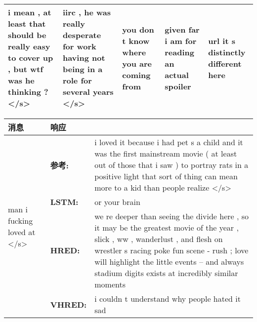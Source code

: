 \begin{table}
\begin{tabular}{
    m{}
    m{}
    m{}
    m{}
    m{}
    }
        \hline
        i mean , at least that should be really easy to cover up , but wtf was he thinking ? </s> & iirc , he was really desperate for work having not being in a role for several years </s> & you don t know where you are coming from & given far i am for reading an actual spoiler & url it s distinctly different here \\
        \hline
    \end{tabular}
\end{table}

\begin{table}
    \centering
    \begin{tabular}{llm{}}
        \toprule
        消息 & 响应 \\
        \midrule
        \multirow{4}{*}{man i fucking loved at </s> }
        & \textbf{参考:} & i loved it because i had pet s a child and it was the first mainstream movie ( at least out of those that i saw ) to portray rats in a positive light that sort of thing can mean more to a kid than people realize </s> \\
        & \textbf{LSTM:} & or your brain \\
        & \textbf{HRED:} & we re deeper than seeing the divide here , so it may be the greatest movie of the year , slick , ww , wanderlust , and flesh on wrestler s racing poke fun scene - rush ; love will highlight the little events -- and always stadium digits exists at incredibly similar moments \\
        & \textbf{VHRED:} & i couldn t understand why people hated it sad \\
        \bottomrule
    \end{tabular}
\end{table}
